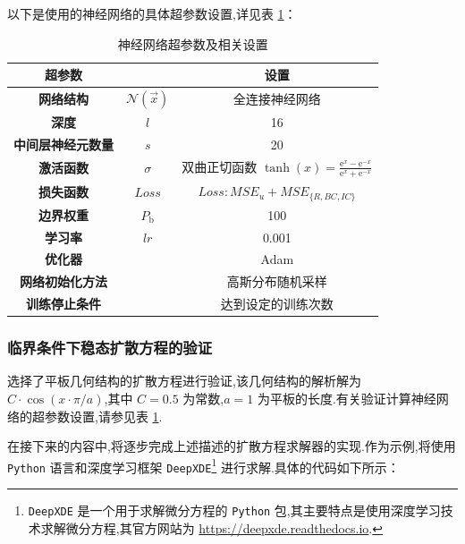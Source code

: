\documentclass{Sichuan Normal University}
\begin{document}
以下是使用的神经网络的具体超参数设置,详见表 \ref{tab:hyperparameter_settings}：
\begin{table}[H]
    \caption{神经网络超参数及相关设置}
    \centering
    \begin{tabular}{ccc}
        \toprule
        \textbf{超参数} && \textbf{设置} \\
        \midrule
        \textbf{网络结构} &$\mathcal{N}(\vec{x})$& 全连接神经网络 \\
        \textbf{深度} &$l$& 16 \\
        \textbf{中间层神经元数量}  &$s$& 20 \\
        \textbf{激活函数} &$\sigma$& 双曲正切函数  $\tanh(x)=\frac{\mathrm{e}^x-\mathrm{e}^{-x}}{\mathrm{e}^x+\mathrm{e}^{-x}}$ \\
        \textbf{损失函数} &$Loss$& $Loss: M S E_u+M S E_{\{R, B C, I C\}}$ \\
        \textbf{边界权重}  &$P_{\mathrm{b}}$& 100 \\
        \textbf{学习率} &$lr$& 0.001  \\
        \textbf{优化器} && Adam  \\
        \textbf{网络初始化方法} && 高斯分布随机采样 \\
        \textbf{训练停止条件} && 达到设定的训练次数\\
        \bottomrule
    \end{tabular}
    \label{tab:hyperparameter_settings}
\end{table}
\subsubsection{临界条件下稳态扩散方程的验证}

选择了平板几何结构的扩散方程进行验证,该几何结构的解析解为$C\cdot\cos(x\cdot\pi/a)$,其中 $C=0.5$ 为常数,$a=1$ 为平板的长度.有关验证计算神经网络的超参数设置,请参见表 \ref{tab:hyperparameter_settings}.

在接下来的内容中,将逐步完成上述描述的扩散方程求解器的实现.作为示例,将使用 \texttt{Python} 语言和深度学习框架 \texttt{DeepXDE}\footnote{\texttt{DeepXDE} 是一个用于求解微分方程的 \texttt{Python} 包,其主要特点是使用深度学习技术求解微分方程,其官方网站为 \url{https://deepxde.readthedocs.io}.} 进行求解.具体的代码如下所示：
\end{document}

